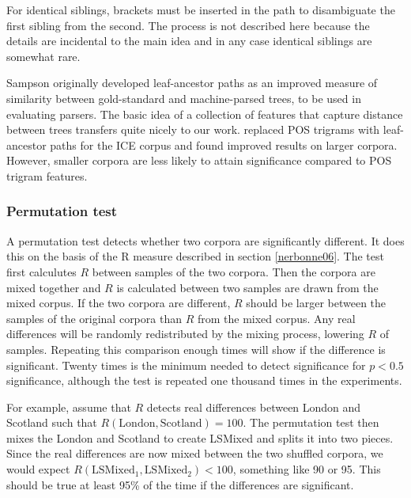 \documentclass[11pt]{article}
\begin{document}
For identical siblings, brackets must be inserted in the path to
disambiguate the first sibling from the second. The process is not
described here because the details are incidental to the main idea and
in any case identical siblings are somewhat rare.

Sampson originally developed leaf-ancestor paths as an improved
measure of similarity between gold-standard and machine-parsed trees,
to be used in evaluating parsers. The basic idea of a collection of
features that capture distance between trees transfers quite nicely to
our work.  replaced POS trigrams with
leaf-ancestor paths for the ICE corpus and found improved results on
larger corpora. However, smaller corpora are less likely to attain
significance compared to POS trigram features.


\subsubsection{Permutation test}
\label{permutationtest}

A permutation test detects whether two corpora are significantly
different. It does this on the basis of the R measure described in
section \ref{nerbonne06}. The test first calculutes $R$ between
samples of the two corpora. Then the corpora are mixed together and
$R$ is calculated between two samples are drawn from the mixed
corpus. If the two corpora are different, $R$ should be larger between
the samples of the original corpora than $R$ from the mixed
corpus. Any real differences will be randomly redistributed by the
mixing process, lowering $R$ of samples. Repeating this comparison
enough times will show if the difference is significant. Twenty times
is the minimum needed to detect significance for $p < 0.5$
significance, although the test is repeated one thousand times in the
experiments.

For example, assume that $R$ detects real differences between London
and Scotland such that $R(\textrm{London},\textrm{Scotland}) =
100$. The permutation test then mixes the London and Scotland to
create LSMixed and splits it into two pieces. Since the real
differences are now mixed between the two shuffled corpora, we
would expect $R(\textrm{LSMixed}_1, \textrm{LSMixed}_2) < 100$, something
like 90 or 95. This should be true at least 95\% of the time if the
differences are significant.
\end{document}
